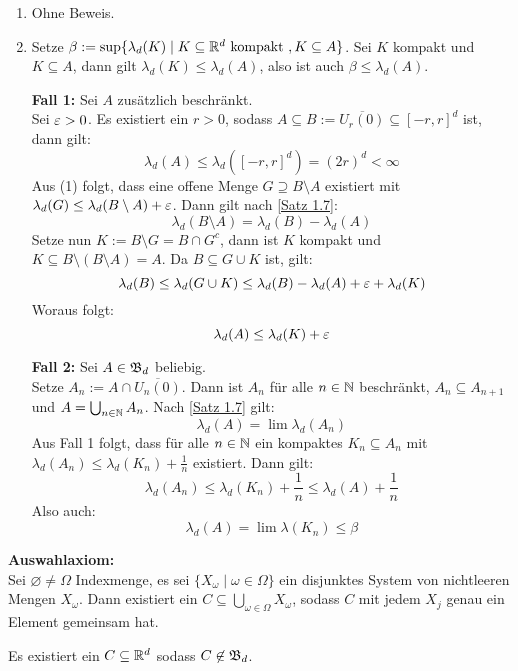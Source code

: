 \documentclass[a4paper,twoside,DIV15,BCOR12mm,chapterprefix=true,headings=onelinechapter]{scrbook}
\begin{document}
\begin{beweis}
\begin{enumerate}
\item Ohne Beweis.
\item Setze $\beta:=\sup\{\lambda_d(K)\mid K\subseteq\mathbb{R}^d\text{ kompakt }, K\subseteq A\}$. Sei $K$ kompakt und $K\subseteq A$, dann gilt $\lambda_d(K)\le\lambda_d(A)$, also ist auch $\beta\le\lambda_d(A)$.

\textbf{Fall 1:} Sei $A$ zusätzlich beschränkt.\\
Sei $\varepsilon>0$. Es existiert ein $r>0$, sodass $A\subseteq B:=\overline{U_r(0)}\subseteq[-r,r]^d$ ist, dann gilt:
\[\lambda_d(A)\le\lambda_d([-r,r]^d)=(2r)^d<\infty\]
Aus (1) folgt, dass eine offene Menge $G\supseteq B\setminus A$ existiert mit $\lambda_d(G)\le\lambda_d(B\setminus A)+\varepsilon$. Dann gilt nach \ref{Satz 1.7}:
\[\lambda_d(B\setminus A)=\lambda_d(B)-\lambda_d(A)\]
Setze nun $K:=B\setminus G=B\cap G^c$, dann ist $K$ kompakt und $K\subseteq B\setminus(B\setminus A)=A$. Da $B\subseteq G\cup K$ ist, gilt:
\[\lambda_d(B)\le\lambda_d(G\cup K)\le \lambda_d(B)-\lambda_d(A)+\varepsilon+\lambda_d(K)\]
Woraus folgt:
\[\lambda_d(A)\le\lambda_d(K)+\varepsilon\]

\textbf{Fall 2:} Sei $A\in\mathfrak{B}_d$ beliebig.\\
Setze $A_n:=A\cap\overline{U_n(0)}$. Dann ist $A_n$ für alle $n\in\mathbb{N}$ beschränkt, $A_n\subseteq A_{n+1}$ und $A=\bigcup_{n\in\mathbb{N}} A_n$. Nach \ref{Satz 1.7} gilt:
\[\lambda_d(A)=\lim\lambda_d(A_n)\]
Aus Fall 1 folgt, dass für alle $n\in\mathbb{N}$ ein kompaktes $K_n\subseteq A_n$ mit $\lambda_d(A_n)\le\lambda_d(K_n)+\frac1n$ existiert. Dann gilt:
\[\lambda_d(A_n)\le\lambda_d(K_n)+\frac1n\le\lambda_d(A)+\frac1n\]
Also auch:
\[\lambda_d(A)=\lim\lambda(K_n)\le\beta\]
\end{enumerate}
\end{beweis}

\textbf{Auswahlaxiom:}\\
Sei $\varnothing\ne\Omega$ Indexmenge, es sei $\{X_\omega\mid \omega\in\Omega\}$ ein disjunktes System von nichtleeren Mengen $X_\omega$. Dann existiert ein $C\subseteq\bigcup_{\omega\in\Omega}X_\omega$, sodass $C$ mit jedem $X_j$ genau ein Element gemeinsam hat.

\begin{satz}
\label{Satz 2.11}
Es existiert ein $C\subseteq\mathbb{R}^d$ sodass $C\not\in\mathfrak{B}_d$.
\end{satz}
\end{document}
